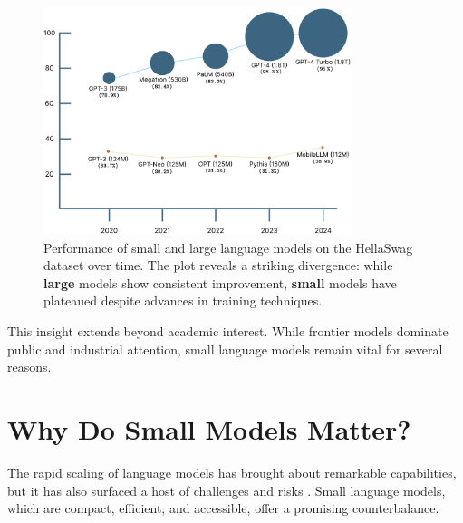 \begin{figure}[htbp]
    \centering
    \includegraphics[width=0.8\textwidth]{chapters/introduction/figures/lm_performance_comparison.pdf}
    \caption{Performance of small and large language models on the HellaSwag dataset over time. The plot reveals a striking divergence: while \textbf{\textcolor[HTML]{37718E}{large}} models show consistent improvement, \textbf{\textcolor[HTML]{FF7F11}{small}} models have plateaued despite advances in training techniques.}
    \label{fig:model_size_vs_performance}
\end{figure}

This insight extends beyond academic interest. While frontier models dominate public and industrial attention, small language models remain vital for several reasons. %

\section*{Why Do Small Models Matter?}


The rapid scaling of language models has brought about remarkable capabilities, but it has also surfaced a host of challenges and risks \citep{bommasani2021foundation}. Small language models, which are compact, efficient, and accessible, offer a promising counterbalance.

